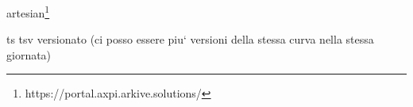 

artesian\footnote{https://portal.axpi.arkive.solutions/}

ts
tsv versionato (ci posso essere piu` versioni della stessa curva nella stessa giornata)

% 	







